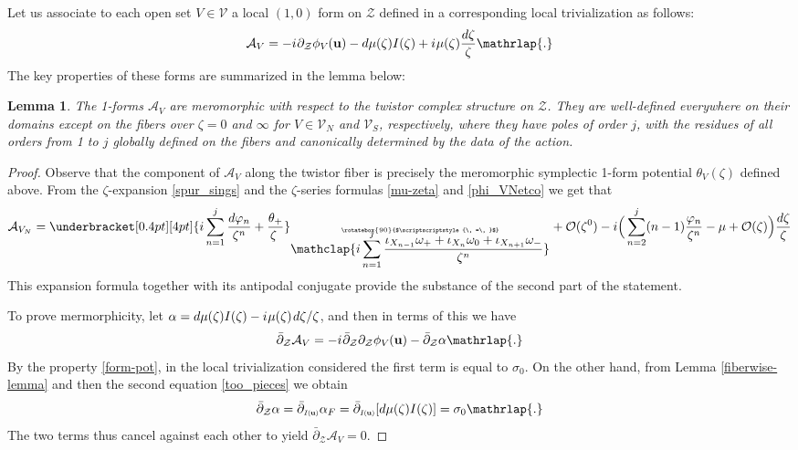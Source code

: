 \documentclass[11pt]{amsart}
\newtheorem{lemma}[theorem]{Lemma}
\theoremstyle{remark}
\theoremstyle{remark}
\theoremstyle{definition}
\theoremstyle{definition}
\theoremstyle{definition}
\newcommand{\Iu}{\scriptscriptstyle{I\nhp(\nhp\mathbf{u}\hspace{-0.25pt})}} %
\newcommand{\0}{{\scriptstyle 0'}} %
\newcommand{\1}{{\scriptstyle 1'}}
\newcommand{\pt}{\hspace{1pt}} %
\newcommand{\hp}{\hspace{0.5pt}} %
\newcommand{\nhp}{\hspace{-0.5pt}} %
\begin{document}
Let us associate to each open set $V \in \mathscr{V}$ a local $(1,0)$ form on $\mathcal{Z}$ defined in a corresponding local trivialization as follows:
\begin{equation} \label{A_V-def}
\mathcal{A}_V = - i\hp\partial_{\mathcal{Z}} \phi_V\nhp(\mathbf{u}) - d\mu(\zeta)I(\zeta) + i \hp \mu(\zeta) \frac{d\zeta}{\zeta} \mathrlap{.}
\end{equation}
The key properties of these forms are summarized in the lemma below:

\begin{lemma} \label{A_V_mero}
The 1-forms $\mathcal{A}_V$ are meromorphic with respect to the twistor complex structure on $\mathcal{Z}$.  They are well-defined everywhere on their domains except on the fibers over $\zeta=0$ and $\infty$ for $V \in \mathscr{V}_N$ and $\mathscr{V}_S$, respectively, where they have poles of order $j$, with the residues of all orders from 1 to $j$ globally defined on the fibers and canonically determined by the data of the action.
\end{lemma}

\begin{proof}
Observe that the component of $\mathcal{A}_V$ along the twistor fiber is precisely the meromorphic symplectic 1-form potential $\theta_V(\zeta)$ defined above. From the $\zeta$-expansion \eqref{spur_sings} and the $\zeta$-series formulas \eqref{mu-zeta} and \eqref{phi_VNetco} we get that 
{\allowdisplaybreaks
\begin{equation} \label{princ_part_N}
\mathcal{A}_{V_N} = \underbracket[0.4pt][4pt]{ i \sum_{n=1}^j \frac{d\varphi_n}{\zeta^n} + \frac{\theta_+}{\zeta\ } }_{\stackrel{\rotatebox{90}{$\scriptscriptstyle{\, =\, }$}}{\text{\normalsize{$\displaystyle \mathclap{ i \sum_{n=1}^{\smash[t]{j}} \frac{\iota_{X_{n-1}}\omega_+ + \iota_{X_{n}}\omega_0 + \iota_{X_{n+1}}\omega_-}{\zeta^n} }$}}}} + \mathcal{O}(\zeta^0) - i \Big( \sum_{n=2}^j (n-1) \frac{\varphi_n}{\zeta^n} - \mu + \mathcal{O}(\zeta) \Big) \frac{d\zeta}{\zeta}
\end{equation}
}%
This expansion formula together with its antipodal conjugate provide the substance of the second part of the statement.

To prove mermorphicity, let $\alpha = d\mu(\zeta)I(\zeta) - i \hp \mu(\zeta) \pt d\zeta/\zeta$, and then in terms of this we have 
\begin{equation}
\bar{\partial}_{\mathcal{Z}} \mathcal{A}_V = - i \hp \bar{\partial}_{\mathcal{Z}}\partial_{\mathcal{Z}} \phi_V\nhp(\mathbf{u}) -  \bar{\partial}_{\mathcal{Z}} \alpha \mathrlap{.}
\end{equation}
By the property \eqref{form-pot}, in the local trivialization considered the first term is equal to $\sigma_0$. On the other hand, from Lemma \ref{fiberwise-lemma} and then the second equation \eqref{too_pieces} we obtain 
\begin{equation}
\bar{\partial}_{\mathcal{Z}} \alpha = \bar{\partial}_{\Iu} \alpha_F = \bar{\partial}_{\Iu} [d\mu(\zeta)I(\zeta)] = \sigma_0 \mathrlap{.}
\end{equation}
The two terms thus cancel against each other to yield $\bar{\partial}_{\mathcal{Z}} \mathcal{A}_V = 0$.
\end{proof}
\end{document}
